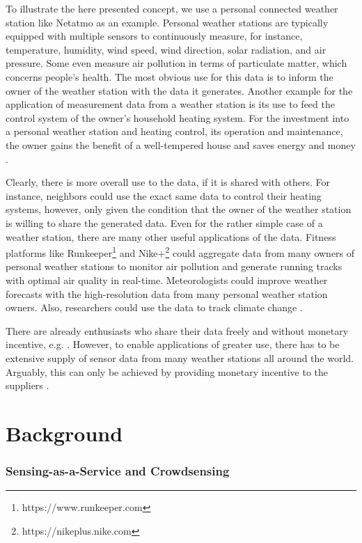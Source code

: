 To illustrate the here presented concept, we use a personal connected weather station like Netatmo \parencite{netatmo} as an example. Personal weather stations are typically equipped with multiple sensors to continuously measure, for instance, temperature, humidity, wind speed, wind direction, solar radiation, and air pressure. Some even measure air pollution in terms of particulate matter, which concerns people's health. The most obvious use for this data is to inform the owner of the weather station with the data it generates. Another example for the application of measurement data from a weather station is its use to feed the control system of the owner's household heating system. For the investment into a personal weather station and heating control, its operation and maintenance, the owner gains the benefit of a well-tempered house and saves energy and money \parencite{dong2014real}. 

Clearly, there is more overall use to the data, if it is shared with others. For instance, neighbors could use the exact same data to control their heating systems, however, only given the condition that the owner of the weather station is willing to share the generated data. Even for the rather simple case of a weather station, there are many other useful applications of the data. Fitness platforms like Runkeeper\footnote{https://www.runkeeper.com} and Nike+\footnote{https://nikeplus.nike.com} could aggregate data from many owners of personal weather stations to monitor air pollution and generate running tracks with optimal air quality in real-time. Meteorologists could improve weather forecasts with the high-resolution data from many personal weather station owners. Also, researchers could use the data to track climate change \parencite{JOC:JOC1276}.

There are already enthusiasts who share their data freely and without monetary incentive, e.g. \parencite{wunderground.com}. However, to enable applications of greater use, there has to be extensive supply of sensor data from many weather stations all around the world. Arguably, this can only be achieved by providing monetary incentive to the suppliers \parencite{bohli2009initial}.

\section{Background}
\label{sec:s2aas_background}
\subsubsection*{Sensing-as-a-Service and Crowdsensing}

